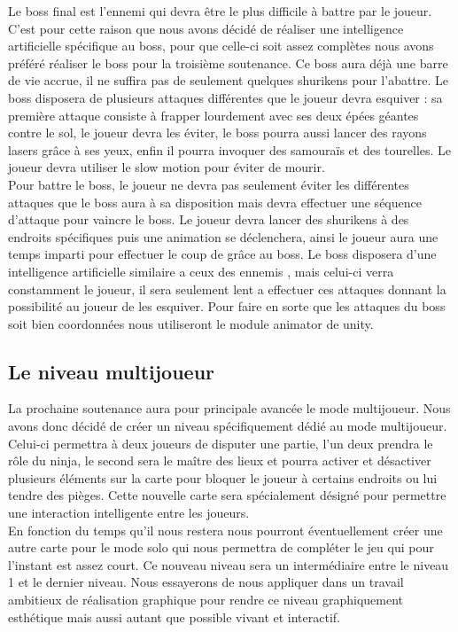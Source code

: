 \documentclass[12pt]{article}
\begin{document}
Le boss final est l'ennemi qui devra être le plus difficile à battre par le joueur. C'est pour cette raison que nous avons décidé de réaliser une intelligence artificielle spécifique au boss, pour que celle-ci soit assez complètes nous avons préféré réaliser le boss pour la troisième soutenance. Ce boss aura déjà une barre de vie accrue, il ne suffira pas de seulement quelques shurikens pour l'abattre. Le boss disposera de plusieurs attaques différentes que le joueur devra esquiver : sa première attaque consiste à frapper lourdement avec ses deux épées géantes contre le sol, le joueur devra les éviter, le boss pourra aussi lancer des rayons lasers grâce à ses yeux, enfin il pourra invoquer des samouraïs et des tourelles. Le joueur devra utiliser le slow motion pour éviter de mourir.\\
Pour battre le boss, le joueur ne devra pas seulement éviter les différentes attaques que le boss aura à sa disposition mais devra effectuer une séquence d'attaque pour vaincre le boss. Le joueur devra lancer des shurikens à des endroits spécifiques puis une animation se déclenchera, ainsi le joueur aura une temps imparti pour effectuer le coup de grâce au boss. Le boss disposera d'une intelligence artificielle similaire a ceux des ennemis , mais celui-ci verra constamment le joueur, il sera seulement lent a effectuer ces attaques donnant la possibilité au joueur de les esquiver. Pour faire en sorte que les attaques du boss soit bien coordonnées nous utiliseront le module animator de unity.

\subsection{Le niveau multijoueur}

La prochaine soutenance aura pour principale avancée le mode multijoueur. Nous avons donc décidé de créer un niveau spécifiquement dédié au mode multijoueur. Celui-ci permettra à deux joueurs de disputer une partie, l'un deux prendra le rôle du ninja, le second sera le maître des lieux et pourra activer et désactiver plusieurs éléments sur la carte pour bloquer le joueur à certains endroits ou lui tendre des pièges. Cette nouvelle carte sera spécialement désigné pour permettre une interaction intelligente entre les joueurs.\\

En fonction du temps qu'il nous restera nous pourront éventuellement créer une autre carte pour le mode solo qui nous permettra de compléter le jeu qui pour l'instant est assez court. Ce nouveau niveau sera un intermédiaire entre le niveau 1 et le dernier niveau. Nous essayerons de nous appliquer dans un travail ambitieux de réalisation graphique pour rendre ce niveau graphiquement esthétique mais aussi autant que possible vivant et interactif.
\end{document}
